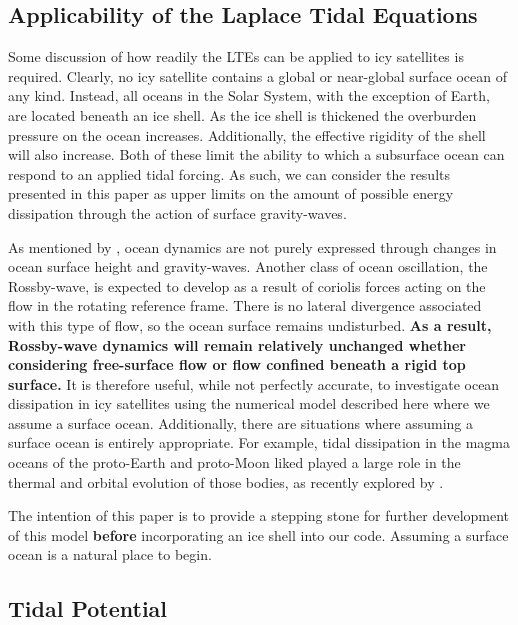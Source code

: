 \subsection{Applicability of the Laplace Tidal Equations \label{subsec:applicability}}

Some discussion of how readily the LTEs can be applied to icy satellites is required. Clearly, no icy satellite contains a global or near-global surface ocean of any kind. Instead, all oceans in the Solar System, with the exception of Earth, are located beneath an ice shell. As the ice shell is thickened the overburden pressure on the ocean increases. Additionally, the effective rigidity of the shell will also increase. Both of these limit the ability to which a subsurface ocean can respond to an applied tidal forcing. As such, we can consider the results presented in this paper as upper limits on the amount of possible energy dissipation through the action of surface gravity-waves.   

As mentioned by \citet{tyler2008strong}, ocean dynamics are not purely expressed through changes in ocean surface height and gravity-waves. Another class of ocean oscillation, the Rossby-wave, is expected to develop as a result of coriolis forces acting on the flow in the rotating reference frame. There is no lateral divergence associated with this type of flow, so  the ocean surface remains undisturbed. \textbf{As a result, Rossby-wave dynamics will remain relatively unchanged whether considering free-surface flow or flow confined beneath a rigid top surface.} It is therefore useful, while not perfectly accurate, to investigate ocean dissipation in icy satellites using the numerical model described here where we assume a surface ocean. Additionally, there are situations where assuming a surface ocean is entirely appropriate. For example, tidal dissipation in the magma oceans of the proto-Earth and proto-Moon liked played a large role in the thermal and orbital evolution of those bodies, as recently explored by \citet{chen2016tidal}.

The intention of this paper is to provide a stepping stone for further development of this model \textbf{before} incorporating an ice shell into our code. Assuming a surface ocean is a natural place to begin.


\subsection{Tidal Potential \label{subsec:pot}}

